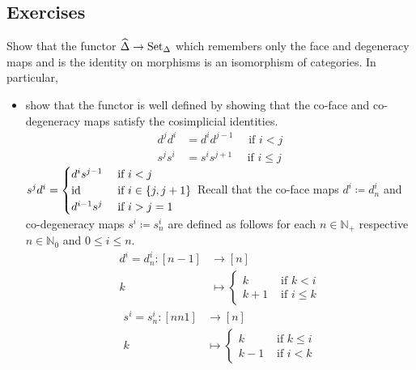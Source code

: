 \subsection{Exercises}

\begin{Exercise}
        Show that the functor $ \widehat{ \Delta }  \to \operatorname{Set}_{\Delta} $ which remembers only the face and degeneracy maps and is the identity on morphisms is an isomorphism of categories. 
        In particular,
         \begin{itemize}
             \item 
             show that the functor is well defined by showing that the co-face and co-degeneracy maps satisfy the cosimplicial identities.
             \begin{align*}
                 d^jd^i &= d^i d^{j-1} \quad \text{ if } i < j
                 \\
                 s^j s^i &= s^i s^{j+1} \quad \text{ if } i \leq j
             \end{align*}
             \qquad
             $
             s^j d^i=
             \begin{cases}
                 d^i s^{j-1} &\text{ if } i < j 
                 \\
                 \operatorname{id} &\text{ if } i \in \{ j , j + 1 \}
                 \\
                 d^{i-1} s^j &\text{ if } i > j = 1
             \end{cases}
             $
             Recall that the co-face maps $ d^i \coloneqq d_n^i $ and co-degeneracy maps $ s^i \coloneqq s_n^i $ are defined as follows for each $ n \in \mathbb{ N }_+ $ respective $ n \in \mathbb{ N }_0 $ and $ 0 \leq i \leq n $.  
             \begin{align*}
                 d^i = d_n^i \colon [ n - 1 ] &\to [ n ]
                 \\
                 k &\mapsto 
                 \begin{cases}
                     k & \text{ if } k < i 
                     \\
                     k+1 & \text{ if } i \leq k 
                 \end{cases}
             \end{align*}
             \quad
             \begin{align*}
                 s^i = s_n^i \colon [ n n 1 ] &\to [ n ]
                 \\
                 k &\mapsto 
                 \begin{cases}
                     k & \text{ if } k \leq i 
                     \\
                     k-1 & \text{ if } i < k 
                 \end{cases}
             \end{align*}
        

\end{itemize}
\end{Exercise}
